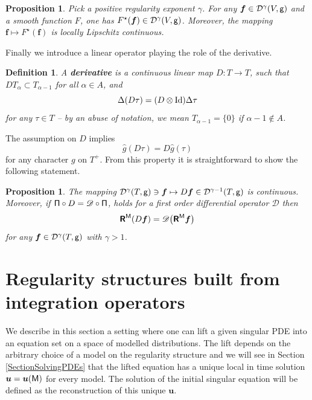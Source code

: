 \documentclass[10pt, reqno]{amsart}
\numberwithin{subsection}{section}
\numberwithin{subsubsection}{subsection}
\numberwithin{equation}{section} %
\theoremstyle{mystyle}
\newtheorem{prop}[thm]{\hspace{-0.13cm} {Proposition}}%
\theoremstyle{mystyle2}
\newtheorem*{defn*} {Definition}
\theoremstyle{mystyle3}
\newcommand{\iden}{\text{\rm Id}}
\newcommand{\bsf}{\boldsymbol{f}}
\newcommand{\bsu}{\boldsymbol{u}}
\newcommand{\mcD}{\mathcal{D}}
\begin{document}
\medskip

\begin{prop} \label{PropFModelled}
Pick a positive regularity exponent $\gamma$. For any $\bsf\in\mcD^\gamma(V,{\sf g})$ and a smooth function $F$, one has $F^\star(\bsf)\in\mcD^\gamma(V,{\sf g})$. Moreover, the mapping $\bsf\mapsto F^\star(\bsf)$ is locally Lipschitz continuous.
\end{prop}

\medskip

Finally we introduce a linear operator playing the role of the derivative.

\medskip

\begin{defn*}
A \textbf{\textsf{derivative}} is a continuous linear map $D:T\to T$, such that $DT_\alpha\subset T_{\alpha-1}$ for all $\alpha\in A$, and
$$
\Delta(D\tau) = (D\otimes\iden)\Delta\tau
$$
for any $\tau\in T$ -- by an abuse of notation, we mean $T_{\alpha-1}=\{0\}$ if $\alpha-1\notin A$.
\end{defn*}

The assumption on $D$ implies
$$
\widehat{g}(D\tau)=D\widehat{g}(\tau)
$$
for any character $g$ on $T^+$. From this property it is straightforward to show the following statement.

\medskip

\begin{prop}\label{prop abstract derivative}
The mapping $\mcD^\gamma(T,{\sf g})\ni \bsf\mapsto D\bsf\in \mcD^{\gamma-1}(T,{\sf g})$ is continuous.
Moreover, if ${\sf\Pi}\circ D=\mathscr{D}\circ {\sf\Pi}$, holds for a first order differential operator $\mathscr{D}$ then
$$
\textbf{\textsf{R}}^{\sf M}(D\bsf) = \mathscr{D}\big(\textbf{\textsf{R}}^{\sf M}\bsf\big)
$$
for any $\bsf\in\mcD^\gamma(T,{\sf g})$ with $\gamma>1$.
\end{prop}



\bigskip



\section{Regularity structures built from integration operators}
\label{SectionIntegration}

We describe in this section a setting where one can lift a given singular PDE into an equation set on a space of modelled distributions. The lift depends on the arbitrary choice of a model on the regularity structure and we will see in Section \ref{SectionSolvingPDEs} that the lifted equation has a unique local in time solution $\bsu=\bsu(\sf M)$ for every model. The solution of the initial singular equation will be defined as the reconstruction of this unique $\bsu$.
\end{document}
